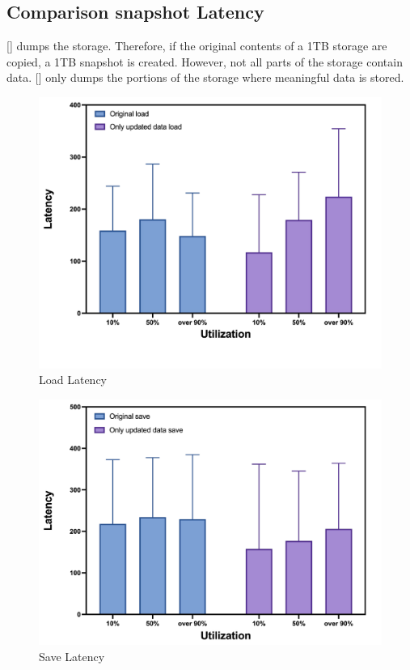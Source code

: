 
\subsection{Comparison snapshot Latency}
[] dumps the storage.
Therefore, if the original contents of a 1TB storage are copied, a 1TB snapshot is created.
However, not all parts of the storage contain data.
[] only dumps the portions of the storage where meaningful data is stored.

\begin{figure}[t]
    \centering
	\includegraphics[width=0.95\columnwidth]{graphs/load_latency}
	\caption{Load Latency}
	\label{f:load_latency}
\end{figure}

\begin{figure}[t]
    \centering
	\includegraphics[width=0.95\columnwidth]{graphs/save_latency}
	\caption{Save Latency}
	\label{f:save_latency}
\end{figure}

